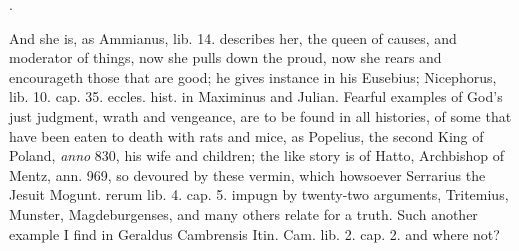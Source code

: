 {.

And she is, as Ammianus, \textlatin{lib. 14.} describes her, the queen of
causes, and moderator of things, now she pulls down the proud, now she
rears and encourageth those that are good; he gives instance in his
Eusebius; Nicephorus, \textlatin{lib. 10. cap. 35. eccles. hist.} in Maximinus and
Julian. Fearful examples of God's just judgment, wrath and vengeance,
are to be found in all histories, of some that have been eaten to death
with rats and mice, as Popelius, the second King of Poland, \emph{anno}
830, his wife and children; the like story is of Hatto, Archbishop of
Mentz, ann. 969, so devoured by these vermin, which howsoever Serrarius
the Jesuit Mogunt. \textlatin{rerum lib. 4. cap. 5.} impugn by twenty-two
arguments, Tritemius, Munster, Magdeburgenses, and many others
relate for a truth. Such another example I find in Geraldus Cambrensis
\textlatin{Itin. Cam. lib. 2. cap. 2.} and where not?

}
